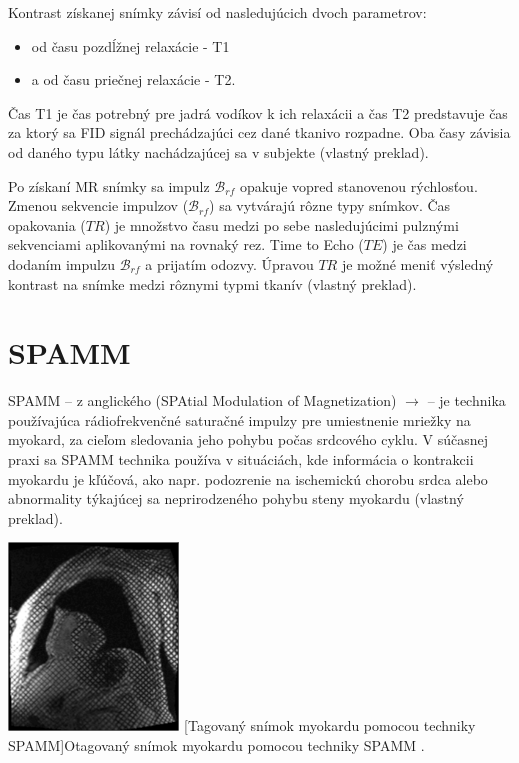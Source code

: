 Kontrast získanej snímky závisí od nasledujúcich dvoch parametrov:

\begin {itemize}
\item {od času pozdĺžnej relaxácie - T1}
\item {a od času priečnej relaxácie - T2.}
\end {itemize}

Čas T1 je čas potrebný pre jadrá vodíkov k ich relaxácii a čas T2 predstavuje čas za ktorý sa FID signál prechádzajúci cez dané tkanivo rozpadne. Oba časy závisia od daného typu látky nachádzajúcej sa v subjekte \cite{basic_principles_of_mri} (vlastný preklad).

Po získaní MR snímky sa impulz $\mathcal{B}_{rf}$ opakuje vopred stanovenou rýchlosťou. Zmenou sekvencie impulzov ($\mathcal{B}_{rf}$) sa vytvárajú rôzne typy snímkov. Čas opakovania ($TR$) je množstvo času medzi po sebe nasledujúcimi pulznými sekvenciami aplikovanými na rovnaký rez. Time to Echo ($TE$) je čas medzi dodaním impulzu $\mathcal{B}_{rf}$ a prijatím odozvy. Úpravou $TR$ je možné meniť výsledný kontrast na snímke medzi rôznymi typmi tkanív \cite{basic_principles_of_mri} (vlastný preklad).

\section {SPAMM}
SPAMM -- z anglického (SPAtial Modulation of Magnetization) $\rightarrow$  -- je technika používajúca rádiofrekvenčné saturačné impulzy pre umiestnenie mriežky na myokard, za cieľom sledovania jeho pohybu počas srdcového cyklu. V súčasnej praxi sa SPAMM technika používa v situáciách, kde informácia o kontrakcii myokardu je kľúčová, ako napr. podozrenie na ischemickú chorobu srdca alebo abnormality týkajúcej sa neprirodzeného pohybu steny myokardu \cite{spamm_description} (vlastný preklad).

\begin {center}
        \centering
        \includegraphics[height=5cm]{media/heart/tagged_heart.png}
        \captionsetup{justification=centering}
        [Tagovaný snímok myokardu pomocou techniky SPAMM]{Otagovaný snímok myokardu pomocou techniky SPAMM \cite{spamm_description}.}
\end {center}

